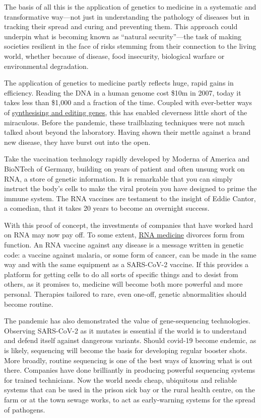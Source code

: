 \documentclass{article}
\begin{document}
The basis of all this is the application of genetics to medicine in a systematic and transformative way---not just in understanding the pathology of diseases but in tracking their spread and curing and preventing them. This approach could underpin what is becoming known as ``natural security''---the task of making societies resilient in the face of risks stemming from their connection to the living world, whether because of disease, food insecurity, biological warfare or environmental degradation. 

 

The application of genetics to medicine partly reflects huge, rapid gains in efficiency. Reading the DNA in a human genome cost \$10m in 2007, today it takes less than \$1,000 and a fraction of the time. Coupled with ever-better ways of \href{/technology-quarterly/2021-03-27}{synthesising and editing genes}, this has enabled cleverness little short of the miraculous. Before the pandemic, these trailblazing techniques were not much talked about beyond the laboratory. Having shown their mettle against a brand new disease, they have burst out into the open. 

Take the vaccination technology rapidly developed by Moderna of America and BioNTech of Germany, building on years of patient and often unsung work on RNA, a store of genetic information. It is remarkable that you can simply instruct the body's cells to make the viral protein you have designed to prime the immune system. The RNA vaccines are testament to the insight of Eddie Cantor, a comedian, that it takes 20 years to become an overnight success. 

With this proof of concept, the investments of companies that have worked hard on RNA may now pay off. To some extent, \href{/briefing/2021/03/27/covid-19-vaccines-have-alerted-the-world-to-the-power-of-rna-therapies}{RNA medicine} divorces form from function. An RNA vaccine against any disease is a message written in genetic code: a vaccine against malaria, or some form of cancer, can be made in the same way and with the same equipment as a SARS-CoV-2 vaccine. If this provides a platform for getting cells to do all sorts of specific things and to desist from others, as it promises to, medicine will become both more powerful and more personal. Therapies tailored to rare, even one-off, genetic abnormalities should become routine. 

The pandemic has also demonstrated the value of gene-sequencing technologies. Observing SARS-CoV-2 as it mutates is essential if the world is to understand and defend itself against dangerous variants. Should covid-19 become endemic, as is likely, sequencing will become the basis for developing regular booster shots. More broadly, routine sequencing is one of the best ways of knowing what is out there. Companies have done brilliantly in producing powerful sequencing systems for trained technicians. Now the world needs cheap, ubiquitous and reliable systems that can be used in the prison sick bay or the rural health centre, on the farm or at the town sewage works, to act as early-warning systems for the spread of pathogens. 
\end{document}
